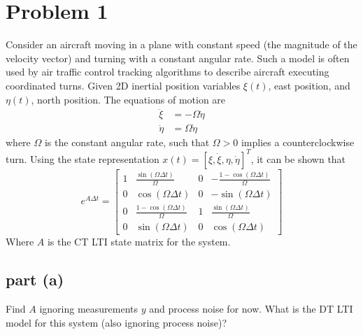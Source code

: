 \documentclass[11pt]{article}
\begin{document}
\thispagestyle{empty}

\newlength{\boxlength}\setlength{\boxlength}{\textwidth}
\addtolength{\boxlength}{-4mm}

\begin{center}
\end{center}

\section*{Problem 1}

Consider an aircraft moving in a plane with constant speed (the magnitude of the velocity vector) and turning with a constant angular rate. Such a model is often used by air traffic control tracking algorithms to describe aircraft executing coordinated turns. Given 2D inertial position variables $\xi(t)$, east position, and $\eta(t)$, north position. The equations of motion are 
\begin{align*}
	\ddot{\xi} &= -\Omega\dot{\eta} \\
	\ddot{\eta} &= \Omega\dot{\eta}
\end{align*}
where $\Omega$ is the constant angular rate, such that $\Omega > 0$ implies a counterclockwise turn. Using the state representation $x(t)=[\xi,\dot{\xi},\eta,\dot{\eta}]^T$, it can be shown that 
\begin{equation*}
	e^{A\Delta t} = \begin{bmatrix} 1 & \frac{\sin(\Omega\Delta t)}{\Omega} & 0 & -\frac{1-\cos(\Omega\Delta t)}{\Omega} \\ 0 & \cos(\Omega\Delta t) & 0 & -\sin(\Omega\Delta t) \\ 0 & \frac{1-\cos(\Omega\Delta t)}{\Omega} & 1 & \frac{\sin(\Omega\Delta t)}{\Omega} \\ 0 & \sin(\Omega\Delta t) & 0 & \cos(\Omega\Delta t) \end{bmatrix}
\end{equation*}
Where $A$ is the CT LTI state matrix for the system.

\subsection*{part (a)}
Find $A$ ignoring measurements $y$ and process noise for now. What is the DT LTI model for this system (also ignoring process noise)?
\end{document}
